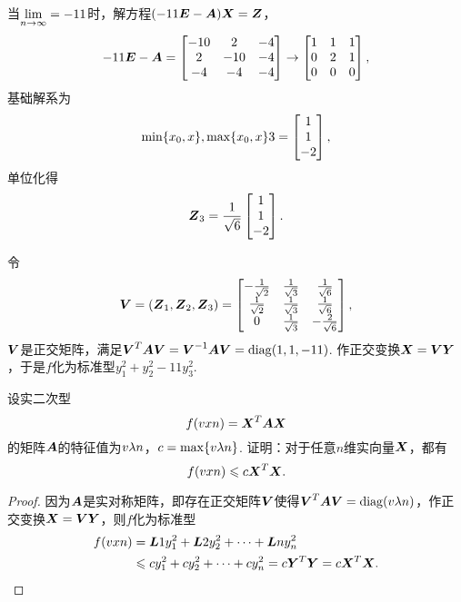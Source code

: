 \begin{example}
\begin{solution}
当\(\lim\limits_{n\to\infty}=-11\)时，解方程\((-11\boldsymbol{E}-\boldsymbol{A})\boldsymbol{X}=\boldsymbol{Z}\)，\[
-11\boldsymbol{E}-\boldsymbol{A} = \begin{bmatrix}
-10 & 2 & -4 \\
2 & -10 & -4 \\
-4 & -4 & -4
\end{bmatrix} \to \begin{bmatrix}
1 & 1 & 1 \\
0 & 2 & 1 \\
0 & 0 & 0
\end{bmatrix},
\]基础解系为\[
\min\{x_0,x\},\max\{x_0,x\}3 = \begin{bmatrix} 1 \\ 1 \\ -2 \end{bmatrix},
\]单位化得\[
\boldsymbol{Z}_3 = \frac{1}{\sqrt{6}} \begin{bmatrix} 1 \\ 1 \\ -2 \end{bmatrix}.
\]

令\[
\Q = (\z_1,\z_2,\z_3) = \begin{bmatrix}
-\frac{1}{\sqrt{2}} & \frac{1}{\sqrt{3}} & \frac{1}{\sqrt{6}} \\
\frac{1}{\sqrt{2}} & \frac{1}{\sqrt{3}} & \frac{1}{\sqrt{6}} \\
0 & \frac{1}{\sqrt{3}} & -\frac{2}{\sqrt{6}} \\
\end{bmatrix},
\]\(\Q\)是正交矩阵，满足\(\Q^T\A\Q=\Q^{-1}\A\Q=\diag(1,1,-11)\).
作正交变换\(\x=\Q\y\)，于是\(f\)化为标准型\(y_1^2+y_2^2-11y_3^2\).
\end{solution}
\end{example}

\begin{example}
设实二次型\[
f(v{x}{n})=\boldsymbol{X}^T\boldsymbol{A}\boldsymbol{X}
\]的矩阵\(\boldsymbol{A}\)的特征值为\(v{\lambda}{n}\)，\(c=\max\{v{\lambda}{n}\}\).
证明：对于任意\(n\)维实向量\(\boldsymbol{X}\)，都有\[
f(v{x}{n}) \leqslant c \boldsymbol{X}^T\boldsymbol{X}.
\]
\begin{proof}
因为\(\boldsymbol{A}\)是实对称矩阵，即存在正交矩阵\(\Q\)使得\(\Q^T\A\Q = \diag(\v{\lambda}{n})\)，作正交变换\(\x=\Q\y\)，则\(f\)化为标准型\begin{align*}
f(v{x}{n}) &= \boldsymbol{L}{1} y_1^2 + \boldsymbol{L}{2} y_2^2 + \dotsb + \boldsymbol{L}{n} y_n^2 \\
&\leqslant c y_1^2 + c y_2^2 + \dotsb + c y_n^2
= c \boldsymbol{Y}^T \boldsymbol{Y} = c \boldsymbol{X}^T \boldsymbol{X}.
\qedhere
\end{align*}
\end{proof}
\end{example}

